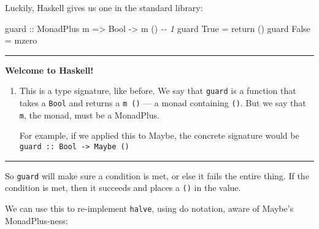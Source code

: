 \documentclass[]{article}
\newenvironment{Shaded}{}{}
\newcommand{\CommentTok}[1]{\textcolor[rgb]{0.38,0.63,0.69}{\textit{#1}}}
\newcommand{\DataTypeTok}[1]{\textcolor[rgb]{0.56,0.13,0.00}{#1}}
\newcommand{\DecValTok}[1]{\textcolor[rgb]{0.25,0.63,0.44}{#1}}
\newcommand{\FunctionTok}[1]{\textcolor[rgb]{0.02,0.16,0.49}{#1}}
\newcommand{\KeywordTok}[1]{\textcolor[rgb]{0.00,0.44,0.13}{\textbf{#1}}}
\newcommand{\NormalTok}[1]{#1}
\newcommand{\OperatorTok}[1]{\textcolor[rgb]{0.40,0.40,0.40}{#1}}
\newcommand{\OtherTok}[1]{\textcolor[rgb]{0.00,0.44,0.13}{#1}}
\begin{document}
Luckily, Haskell gives us one in the standard library:

\begin{Shaded}
\begin{Highlighting}[]
\OtherTok{guard ::} \DataTypeTok{MonadPlus}\NormalTok{ m }\OtherTok{=>} \DataTypeTok{Bool} \OtherTok{{-}>}\NormalTok{ m ()        }\CommentTok{{-}{-} 1}
\NormalTok{guard }\DataTypeTok{True}  \OtherTok{=} \FunctionTok{return}\NormalTok{ ()}
\NormalTok{guard }\DataTypeTok{False} \OtherTok{=}\NormalTok{ mzero}
\end{Highlighting}
\end{Shaded}

\begin{center}\rule{0.5\linewidth}{\linethickness}\end{center}

\textbf{Welcome to Haskell!}

\begin{enumerate}
\def\labelenumi{\arabic{enumi}.}
\item
  This is a type signature, like before. We say that \texttt{guard} is a
  function that takes a \texttt{Bool} and returns a \texttt{m\ ()} --- a monad
  containing \texttt{()}. But we say that \texttt{m}, the monad, must be a
  MonadPlus.

  For example, if we applied this to Maybe, the concrete signature would be
  \texttt{guard\ ::\ Bool\ -\textgreater{}\ Maybe\ ()}
\end{enumerate}

\begin{center}\rule{0.5\linewidth}{\linethickness}\end{center}

So \texttt{guard} will make sure a condition is met, or else it fails the entire
thing. If the condition is met, then it succeeds and places a \texttt{()} in the
value.

We can use this to re-implement \texttt{halve}, using do notation, aware of
Maybe's MonadPlus-ness:

\begin{Shaded}
\end{Shaded}
\end{document}
